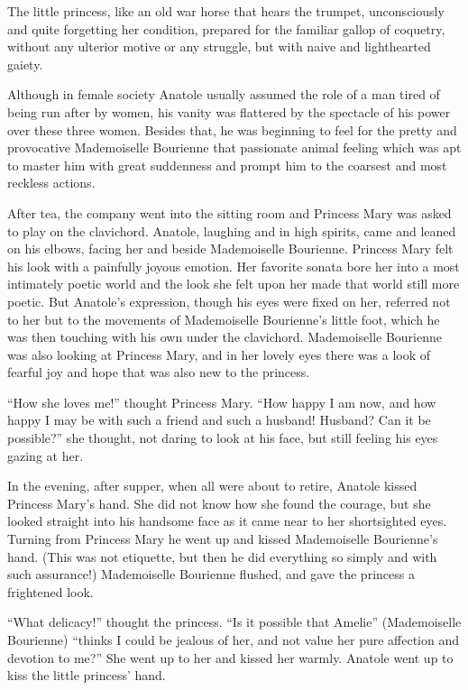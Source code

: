 The little princess, like an old war horse that hears the
trumpet, unconsciously and quite forgetting her condition,
prepared for the familiar gallop of coquetry, without any
ulterior motive or any struggle, but with naive and lighthearted
gaiety.

Although in female society Anatole usually assumed the role of a
man tired of being run after by women, his vanity was flattered
by the spectacle of his power over these three women. Besides
that, he was beginning to feel for the pretty and provocative
Mademoiselle Bourienne that passionate animal feeling which was
apt to master him with great suddenness and prompt him to the
coarsest and most reckless actions.

After tea, the company went into the sitting room and Princess
Mary was asked to play on the clavichord. Anatole, laughing and
in high spirits, came and leaned on his elbows, facing her and
beside Mademoiselle Bourienne. Princess Mary felt his look with a
painfully joyous emotion.  Her favorite sonata bore her into a
most intimately poetic world and the look she felt upon her made
that world still more poetic. But Anatole's expression, though
his eyes were fixed on her, referred not to her but to the
movements of Mademoiselle Bourienne's little foot, which he was
then touching with his own under the clavichord. Mademoiselle
Bourienne was also looking at Princess Mary, and in her lovely
eyes there was a look of fearful joy and hope that was also new
to the princess.

``How she loves me!'' thought Princess Mary. ``How happy I am
now, and how happy I may be with such a friend and such a
husband! Husband? Can it be possible?'' she thought, not daring
to look at his face, but still feeling his eyes gazing at her.

In the evening, after supper, when all were about to retire,
Anatole kissed Princess Mary's hand. She did not know how she
found the courage, but she looked straight into his handsome face
as it came near to her shortsighted eyes. Turning from Princess
Mary he went up and kissed Mademoiselle Bourienne's hand. (This
was not etiquette, but then he did everything so simply and with
such assurance!) Mademoiselle Bourienne flushed, and gave the
princess a frightened look.

``What delicacy!'' thought the princess. ``Is it possible that
Amelie'' (Mademoiselle Bourienne) ``thinks I could be jealous of
her, and not value her pure affection and devotion to me?'' She
went up to her and kissed her warmly. Anatole went up to kiss the
little princess' hand.

